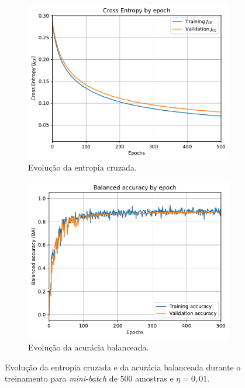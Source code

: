 \begin{figure}[H]
	\begin{subfigure}[H]{0.49\textwidth}
		\centering
		\includegraphics[width = \linewidth]{../../plot/LR_1/CE_500_epochs_batch_size500}
		\caption{Evolução da entropia cruzada.}
		\label{fig:CE_500_epochs_batch_size500}
	\end{subfigure}
	\begin{subfigure}[H]{0.49\textwidth}
		\centering
		\includegraphics[width = \linewidth]{../../plot/LR_1/BA_500_epochs_batch_size500}
		\caption{Evolução da acurácia balanceada.}
		\label{fig:BA_500_epochs_batch_size500}
	\end{subfigure}
	\caption{Evolução da entropia cruzada e da acurácia balanceada durante o treinamento para \textit{mini-batch} de 500 amostras e $\eta = 0,01$.}
\end{figure}

